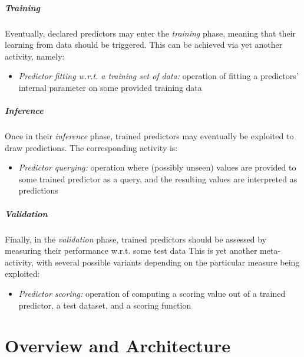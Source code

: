 \documentclass[runningheads]{llncs}
\begin{document}
\subparagraph{Training}
%
Eventually, declared predictors may enter the \emph{training} phase, meaning that their learning from data should be triggered.
%
This can be achieved via yet another activity, namely:
\begin{itemize}
    \item \emph{Predictor fitting w.r.t. a training set of data:} operation of fitting a predictors' internal parameter on some provided training data
\end{itemize}

\subparagraph{Inference}
%
Once in their \emph{inference} phase, trained predictors may eventually be exploited to draw predictions.
The corresponding activity is:
\begin{itemize}
    \item \emph{Predictor querying:} operation where (possibly unseen) values are provided to some trained predictor as a query, and the resulting values are interpreted as predictions
\end{itemize}

\subparagraph{Validation}
%
Finally, in the \emph{validation} phase, trained predictors should be assessed by measuring their performance w.r.t. some test data
%
This is yet another meta-activity, with several possible variants depending on the particular measure being exploited:
%
\begin{itemize}
    \item \emph{Predictor scoring:} operation of computing a scoring value out of a trained predictor, a test dataset, and a scoring function
\end{itemize}

\section{\mllib{} Overview and Architecture}
\end{document}
